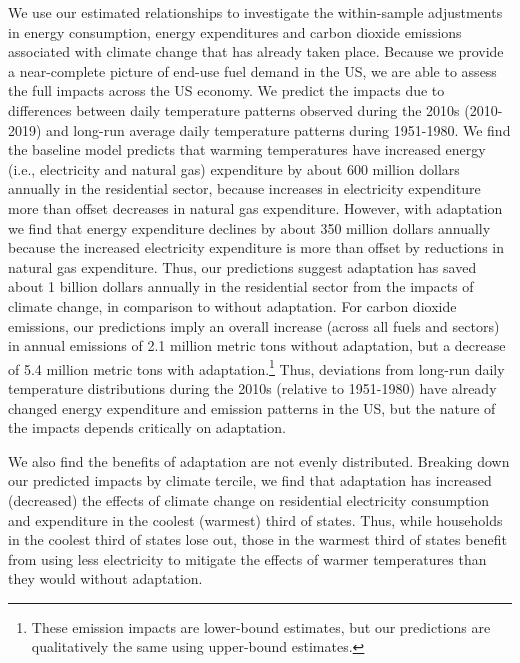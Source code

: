 \documentclass[11pt]{article}
\begin{document}
We use our estimated relationships to investigate the within-sample adjustments in energy consumption, energy expenditures and carbon dioxide emissions associated with climate change that has already taken place. Because we provide a near-complete picture of end-use fuel demand in the US, we are able to assess the full impacts across the US economy. We predict the impacts due to differences between daily temperature patterns observed during the 2010s (2010-2019) and long-run average daily temperature patterns during 1951-1980. We find the baseline model predicts that warming temperatures have increased energy (i.e., electricity and natural gas) expenditure by about 600 million dollars annually in the residential sector, because increases in electricity expenditure more than offset decreases in natural gas expenditure. However, with adaptation we find that energy expenditure declines by about 350 million dollars annually because the increased electricity expenditure is more than offset by reductions in natural gas expenditure. Thus, our predictions suggest adaptation has saved about 1 billion dollars annually in the residential sector from the impacts of climate change, in comparison to without adaptation. For carbon dioxide emissions, our predictions imply an overall increase (across all fuels and sectors) in annual emissions of 2.1 million metric tons without adaptation, but a decrease of 5.4 million metric tons with adaptation.\footnote{These emission impacts are lower-bound estimates, but our predictions are qualitatively the same using upper-bound estimates.} Thus, deviations from long-run daily temperature distributions during the 2010s (relative to 1951-1980) have already changed energy expenditure and emission patterns in the US, but the nature of the impacts depends critically on adaptation.    

We also find the benefits of adaptation are not evenly distributed. Breaking down our predicted impacts by climate tercile, we find that adaptation has increased (decreased) the effects of climate change on residential electricity consumption and expenditure in the coolest (warmest) third of states. Thus, while households in the coolest third of states lose out, those in the warmest third of states benefit from using less electricity to mitigate the effects of warmer temperatures than they would without adaptation. 
\end{document}

